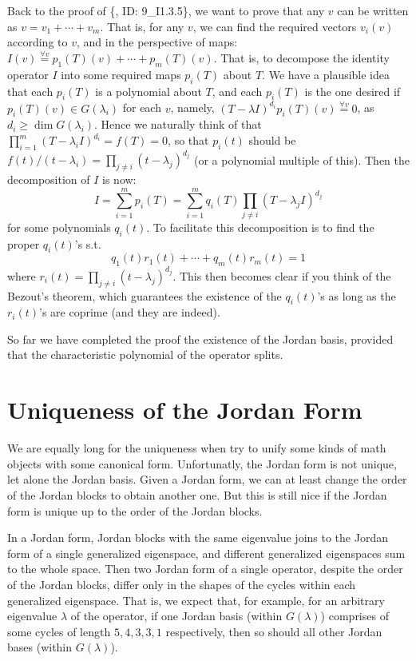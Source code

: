 \documentclass{article}
\begin{document}
Back to the proof of \{, ID: 9\_I1.3.5\}, we want to prove that any $v$ can be written as $v = v_1 + \cdots + v_m$. That is, for any $v$, we can find the required vectors $v_i(v)$ according to $v$, and in the perspective of maps: $I(v)\overset{\forall v}{ = } p_1(T)(v) + \cdots + p_m(T)(v)$. That is, to decompose the identity operator $I$ into some required maps $p_i(T)$ about $T$. We have a plausible idea that each $p_i(T)$ is a polynomial about $T$, and each $p_i(T)$ is the one desired if $p_i(T)(v)\in G(\lambda_i)$ for each $v$, namely, $(T-\lambda I)^{d_i}p_i(T)(v) \overset{\forall v}{=} 0$, as $d_i\geq \dim G(\lambda_i)$. Hence we naturally think of that $\prod_{i=1}^{m}(T-\lambda_i I)^{d_i} = f(T) = 0$, so that $p_i(t)$ should be $f(t)/(t-\lambda_i) = \prod_{j\neq i} (t-\lambda_j)^{d_j}$ (or a polynomial multiple of this). Then the decomposition of $I$ is now:
$$ I = \sum_{i=1}^{m} p_i(T) = \sum_{i=1}^{m} q_i(T)\prod_{j\neq i} (T-\lambda_j I)^{d_j} $$
for some polynomials $q_i(t)$. To facilitate this decomposition is to find the proper $q_i(t)$'s s.t. 
$$ q_1(t)r_1(t) + \cdots + q_m(t)r_m(t) = 1 $$ 
where $r_i(t) = \prod_{j\neq i} (t-\lambda_j)^{d_j}$. This then becomes clear if you think of the Bezout's theorem, which guarantees the existence of the $q_i(t)$'s as long as the $r_i(t)$'s are coprime (and they are indeed).

So far we have completed the proof the existence of the Jordan basis, provided that the characteristic polynomial of the operator splits. 

\section{Uniqueness of the Jordan Form}
We are equally long for the uniqueness when try to unify some kinds of math objects with some canonical form. Unfortunatly, the Jordan form is not unique, let alone the Jordan basis. Given a Jordan form, we can at least change the order of the Jordan blocks to obtain another one. But this is still nice if the Jordan form is unique up to the order of the Jordan blocks.

In a Jordan form, Jordan blocks with the same eigenvalue joins to the Jordan form of a single generalized eigenspace, and different generalized eigenspaces sum to the whole space. Then two Jordan form of a single operator, despite the order of the Jordan blocks, differ only in the shapes of the cycles within each generalized eigenspace. That is, we expect that, for example, for an arbitrary eigenvalue $\lambda$ of the operator, if one Jordan basis (within $G(\lambda)$) comprises of some cycles of length $5,4,3,3,1$ respectively, then so should all other Jordan bases (within $G(\lambda)$).
\end{document}
